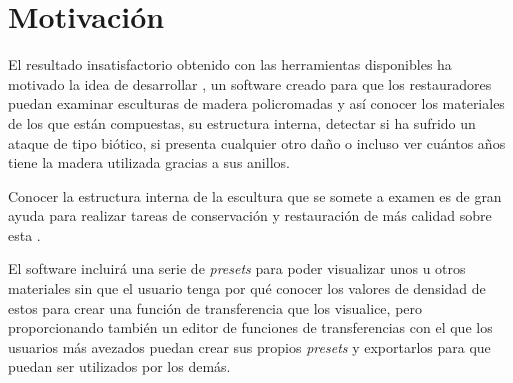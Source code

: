 \section{Motivación}

El resultado insatisfactorio obtenido con las herramientas disponibles ha motivado la idea de desarrollar \myTitle, un software creado para que los restauradores puedan examinar esculturas de madera policromadas y así conocer los materiales de los que están compuestas, su estructura interna, detectar si ha sufrido un ataque de tipo biótico, si presenta cualquier otro daño o incluso ver cuántos años tiene la madera utilizada gracias a sus anillos.

Conocer la estructura interna de la escultura que se somete a examen es de gran ayuda para realizar tareas de conservación y restauración de más calidad sobre esta \cite{tc_esculturas}.

El software incluirá una serie de \textit{presets} para poder visualizar unos u otros materiales sin que el usuario tenga por qué conocer los valores de densidad de estos para crear una función de transferencia que los visualice, pero proporcionando también un editor de funciones de transferencias con el que los usuarios más avezados puedan crear sus propios \textit{presets} y exportarlos para que puedan ser utilizados por los demás.

